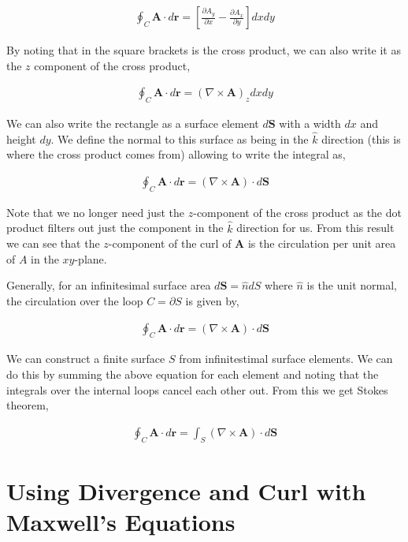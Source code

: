 \documentclass[11pt]{amsart}
\begin{document}
\begin{align*}
  \oint_C \mathbf{A} \cdot d\mathbf{r} = \left[\frac{\partial A_y}{\partial x} - \frac{\partial A_x}{\partial y}\right] dx dy
\end{align*}

By noting that in the square brackets is the cross product, we can also write it as the $z$ component of the cross product,

\begin{align*}
  \oint_C \mathbf{A} \cdot d\mathbf{r} = {(\nabla \times \mathbf{A})}_z dx dy
\end{align*}

We can also write the rectangle as a surface element $d\mathbf{S}$ with a width $dx$ and height $dy$. We define the normal to this surface as being in the $\hat{k}$ direction (this is where the cross product comes from) allowing to write the integral as,

\begin{align*}
  \oint_C \mathbf{A} \cdot d\mathbf{r} = (\nabla \times \mathbf{A}) \cdot d\mathbf{S}
\end{align*}

Note that we no longer need just the $z$-component of the cross product as the dot product filters out just the component in the $\hat{k}$ direction for us. From this result we can see that the $z$-component of the curl of $\mathbf{A}$ is the circulation per unit area of $A$ in the $xy$-plane.

Generally, for an infinitesimal surface area $d\mathbf{S} = \hat{n} dS$ where $\hat{n}$ is the unit normal, the circulation over the loop $C = \partial S$ is given by,

\begin{align*}
  \oint_C \mathbf{A} \cdot d\mathbf{r} = \left(\nabla \times \mathbf{A}\right) \cdot d\mathbf{S}
\end{align*}

We can construct a finite surface $S$ from infinitestimal surface elements. We can do this by summing the above equation for each element and noting that the integrals over the internal loops cancel each other out. From this we get Stokes theorem,

\begin{align*}
  \oint_C \mathbf{A} \cdot d\mathbf{r} = \int_S \left(\nabla \times \mathbf{A}\right) \cdot d\mathbf{S}
\end{align*}

\section{Using Divergence and Curl with Maxwell's Equations}
\end{document}
